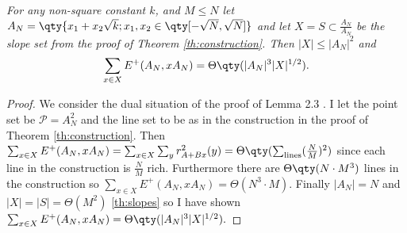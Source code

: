 \documentclass[11pt]{article}
\newcommand{\pts}{\mathcal P}
\begin{document}
$\qquad$\\
\emph{For any non-square constant $k$, and $M \leq N$ let 
\\$A_N = \qty{ x_1 + x_2 \sqrt{k} ; x_1,x_2 \in \qty[-\sqrt{N},\sqrt{N}]}$ and let $X=S \subset \frac{A_N}{A_N}$ be the slope set from the proof of Theorem \ref{th:construction}. Then $|X| \leq |A_N|^2$ and
%
\[ \sum_{x \in X}  E^+(A_N,xA_N) = \Theta\qty( |A_N|^3 |X|^{1/2}). \]
%
}


\begin{proof}
We consider the dual situation of the proof of Lemma 2.3 \cite{MRS13}. I let the point set be $\pts = A_N^2$ and the line set to be as in the construction in the proof of Theorem \ref{th:construction}. Then  $\sum_{x \in X} E^+(A_N,xA_N) = \sum_{x \in X} \sum_{y} r_{A+Bx}^2 (y) = \Theta\qty(\sum_{\text{lines}} (\frac{N}{M})^2)$  since each line in the construction is $\frac{N}{M}$ rich. Furthermore there are $\Theta\qty(N\cdot M^3)$ lines in the construction so $\sum_{x \in X} E^+(A_N,xA_N) = \Theta(N^3\cdot M)$. Finally $|A_N|=N$ and $|X|=|S|=\Theta(M^2)$ \ref{th:slopes} so I have shown $\sum_{x \in X}  E^+(A_N,xA_N) = \Theta\qty( |A_N|^3 |X|^{1/2}).$
\end{proof}



\end{document}
